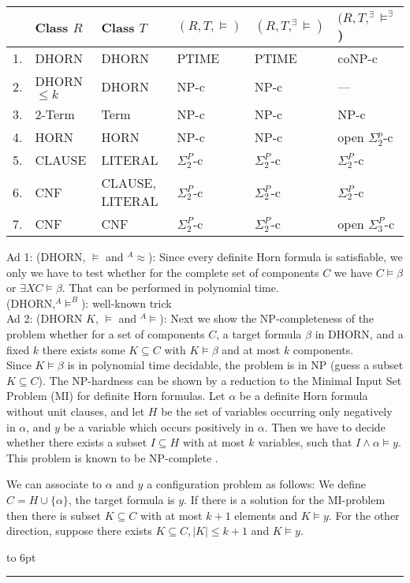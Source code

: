\documentclass[12pt]{article}
\newcommand{\AMB}{\mbox{$^A$\hspace{-0.5mm}$\models^B$}}
\newcommand{\AM}{\mbox{$^A$\hspace{-0.5mm}$\models$}}
\newcommand{\AEQ}{\mbox{$^A$\hspace{-0.5mm}$\approx$}}
\newenvironment{proof}{\parindent=0pt{\bf Proof: }}{
   \hspace*{\fill}\hbox to 6pt{\leaders\hrule width 6pt height 6pt\hfill}\par}
\begin{document}
\noindent\begin{tabular}{|l|l|l|l|l|l|}
\hline
 & {Class $R$ } & Class $T$ &  $(R,T,\models)$ & $(R, T, ^\exists\!\models)$ & $(R, T,^\exists\!\models^\exists$) \\ \hline
1. & DHORN & DHORN          & PTIME & PTIME  & coNP-c         \\ \hline
2. & DHORN $\leq k$ & DHORN & NP-c  & NP-c   & ---         \\ \hline
3. & 2-Term & Term          & NP-c  & NP-c   & NP-c           \\ \hline
4. & HORN & HORN                       & NP-c  & NP-c   & open $\Sigma^p_2$-c \\ \hline
5. & CLAUSE & LITERAL       & $\Sigma_2^P$-c & $\Sigma_2^P$-c & $\Sigma_2^P$-c \\ \hline
6. & CNF & CLAUSE, LITERAL  & $\Sigma_2^P$-c & $\Sigma_2^P$-c & $\Sigma_2^P$-c \\ \hline
7. & CNF & CNF              & $\Sigma_2^P$-c & $\Sigma_2^P$-c & open $\Sigma_3^P$-c \\ \hline
\end{tabular}





\color{black}




\vspace*{5mm}

\begin{proof}
Ad 1: (DHORN, $\models$ and \AEQ): Since every definite Horn formula is satisfiable, we only we have to test whether for the complete set of components $C$ we have $C \models \beta$ or $\exists X C \models \beta$. That can be performed in polynomial time.\\

(DHORN,\AMB): well-known trick\\

Ad 2: (DHORN $K$, $\models$ and \AM): Next we show the NP-completeness of the problem whether for a set of components $C$, a target formula $\beta$ in DHORN, and a fixed $k$ there exists some $K \subseteq C$ with $K \models \beta$ and at most $k$ components.\\
Since $K \models \beta$ is in polynomial time decidable, the problem is in NP (guess a subset $K \subseteq C$).
The NP-hardness can be shown by a reduction to the Minimal Input Set Problem (MI) for definite Horn formulas.
Let $\alpha$ be a definite Horn formula without unit clauses, and let $H$ be the set of variables occurring only
negatively in $\alpha$, and $y$ be a variable which occurs positively in $\alpha$. Then we have to decide whether
there exists a subset $I \subseteq H$ with at most $k$ variables, such that $I \wedge \alpha \models y$. This problem is known to be NP-complete \cite{mi}.

We can associate to $\alpha$ and $y$ a configuration problem as follows: We define $C = H \cup \{\alpha\}$, the target
formula is $y$. If there is a solution for the MI-problem then there is subset $K \subseteq C$ with at most $k+1$ elements
and $K \models y$. For the other direction, suppose there exists $K \subseteq C, |K | \leq k+1$ and $K \models y$.
\end{proof}
\end{document}
